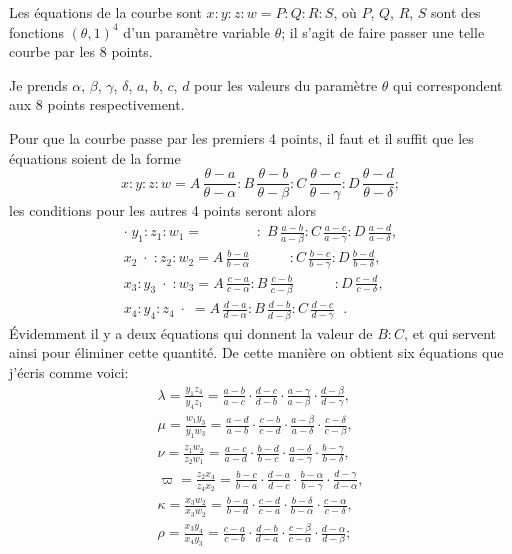 \documentclass[11pt,a4paper]{book}
\begin{document}
\smallskip

Les \'equations de la courbe sont $x:y:z:w=P:Q:R:S$, o\`u $P$, $Q$, $R$, $S$ sont des fonctions $(\theta,1)^4$ d'un param\`etre variable $\theta$; il s'agit de faire passer une telle courbe par les 8 points.

Je prends $\alpha$, $\beta$, $\gamma$, $\delta$, $a$, $b$, $c$, $d$ pour les valeurs du param\`etre $\theta$ qui correspondent aux 8 points respectivement.

Pour que la courbe passe par les premiers 4 points, il faut et il suffit que les \'equations soient de la forme
\[
x:y:z:w=A\,\frac{\theta-a}{\theta-\alpha}:B\,\frac{\theta-b}{\theta-\beta}:C\,\frac{\theta-c}{\theta-\gamma}:D\,\frac{\theta-d}{\theta-\delta};
\]
les conditions pour les autres 4 points seront alors
\begin{gather*}
\cdot\; y_1:z_1:w_1=\phantom{=A\frac{b-a}{b-\alpha}}:\; B\,\frac{a-b}{a-\beta}:C\,\frac{a-c}{a-\gamma}:D\,\frac{a-d}{a-\delta},\\
x_2\;\cdot\;:z_2:w_2=A\,\frac{b-a}{b-\alpha}\phantom{:C\frac{b-c}{b-\gamma}}:C\,\frac{b-c}{b-\gamma}:D\,\frac{b-d}{b-\delta},\\
x_3:y_3\;\cdot\;:w_3=A\,\frac{c-a}{c-\alpha}:B\,\frac{c-b}{c-\beta}\phantom{:D\frac{c-d}{c-\delta}}:D\,\frac{c-d}{c-\delta},\\
x_4:y_4:z_4\;\cdot\;=A\,\frac{d-a}{d-\alpha}:B\,\frac{d-b}{d-\beta}:C\,\frac{d-c}{d-\gamma}\phantom{\cdot}.
\end{gather*}
\'Evidemment il y a deux \'equations qui donnent la valeur de $B:C$, et qui servent ainsi pour \'eliminer cette quantit\'e. De cette mani\`ere on obtient six \'equations que j'\'ecris comme voici:
\begin{gather*}
\lambda=\frac{y_1z_4}{y_4z_1}=\frac{a-b}{a-c}\cdot\frac{d-c}{d-b}\cdot\frac{a-\gamma}{a-\beta}\cdot\frac{d-\beta}{d-\gamma},\\
\mu=\frac{w_1y_3}{y_1w_3}=\frac{a-d}{a-b}\cdot\frac{c-b}{c-d}\cdot\frac{a-\beta}{a-\delta}\cdot\frac{c-\delta}{c-\beta},\\
\nu=\frac{z_1w_2}{z_2w_1}=\frac{a-c}{a-d}\cdot\frac{b-d}{b-c}\cdot\frac{a-\delta}{a-\gamma}\cdot\frac{b-\gamma}{b-\delta},\\
\varpi=\frac{z_2x_4}{z_4x_2}=\frac{b-c}{b-a}\cdot\frac{d-a}{d-c}\cdot\frac{b-\alpha}{b-\gamma}\cdot\frac{d-\gamma}{d-\alpha},\\
\kappa=\frac{x_3w_2}{x_3w_2}=\frac{b-a}{b-d}\cdot\frac{c-d}{c-a}\cdot\frac{b-\delta}{b-\alpha}\cdot\frac{c-\alpha}{c-\delta},\\
\rho=\frac{x_3y_4}{x_4y_3}=\frac{c-a}{c-b}\cdot\frac{d-b}{d-a}\cdot\frac{c-\beta}{c-\alpha}\cdot\frac{d-\alpha}{d-\beta};
\end{gather*}
\end{document}
